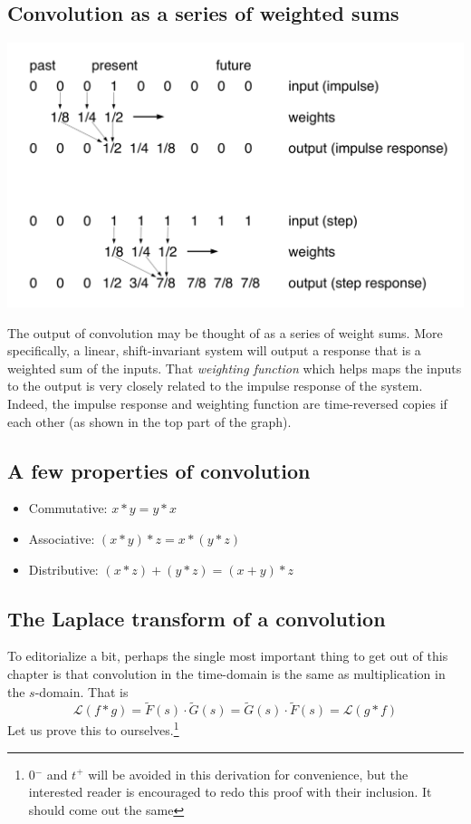 \documentclass[11pt]{book}
\begin{document}
\subsection{Convolution as a series of weighted sums}

\includegraphics[width=\textwidth]{figures/13.02.png}

The output of convolution may be thought of as a series of weight sums. More specifically, a linear, shift-invariant system will output a response that is a weighted sum of the inputs. That \textit{weighting function} which helps maps the inputs to the output is very closely related to the impulse response of the system. Indeed, the impulse response and weighting function are time-reversed copies if each other (as shown in the top part of the graph).

\subsection{A few properties of convolution}
\begin{itemize}
	\item Commutative: $x*y = y*x$
	\item Associative: $(x*y)*z = x*(y*z)$
	\item Distributive: $(x*z)+(y*z)=(x+y)*z$
\end{itemize}

\subsection{The Laplace transform of a convolution}
To editorialize a bit, perhaps the single most important thing to get out of this chapter is that convolution in the time-domain is the same as multiplication in the $s$-domain. That is
\begin{equation}
	\mathcal{L}(f*g) = \tilde{F}(s)\cdot\tilde{G}(s) = \tilde{G}(s)\cdot\tilde{F}(s) = \mathcal{L}(g*f)
\end{equation}
Let us prove this to ourselves.\footnote{0$^-$ and $t^+$ will be avoided in this derivation for convenience, but the interested reader is encouraged to redo this proof with their inclusion. It should come out the same}
\end{document}
